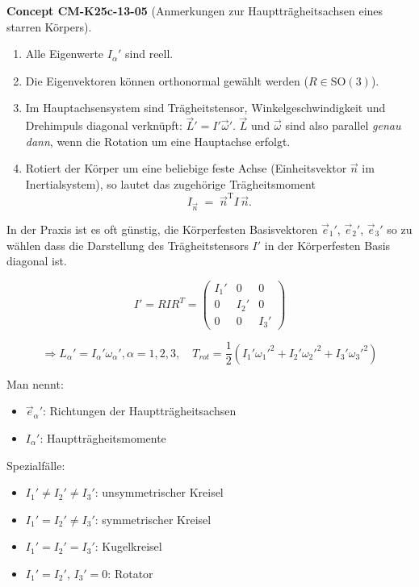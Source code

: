 \documentclass[10pt, letterpaper]{article}
\newcommand{\CustomHeading}[3]{%
  \par\medskip\noindent%
  \textbf{#1 #2} \textnormal{(#3)}.\enskip%
}
\newenvironment{CONC}[2]{\begin{unitbox}\CustomHeading{Concept}{#1}{#2}}{\end{unitbox}}
\begin{document}
\begin{CONC}{CM-K25c-13-05}{Anmerkungen zur Hauptträgheitsachsen eines starren Körpers}
\begin{enumerate}
  \item Alle Eigenwerte $I_\alpha'$ sind reell.
  \item Die Eigenvektoren können orthonormal gewählt werden
        ($R\in\mathrm{SO}(3)$).
  \item Im Hauptachsensystem sind Trägheits­tensor, Winkelgeschwindigkeit
        und Drehimpuls diagonal verknüpft:
        $\vec L' = I' \vec\omega'$.
        $\vec L$ und $\vec\omega$ sind also parallel
        \emph{genau dann},
        wenn die Rotation um eine Hauptachse erfolgt.
  \item Rotiert der Körper um eine beliebige feste Achse
        (Einheitsvektor $\vec n$ im Inertial­system),
        so lautet das zugehörige Trägheitsmoment
        \[
          I_{\vec n} \;=\;
          \vec n^{\mathrm T} I\,\vec n .
        \]
\end{enumerate}
\end{CONC}




In der Praxis ist es oft günstig, die Körperfesten Basisvektoren $\vec{e}_1'$, $\vec{e}_2'$, $\vec{e}_3'$ so zu wählen dass die Darstellung des Trägheitstensors $I'$ in der Körperfesten Basis diagonal ist.

\[
I' = R I R^T = \begin{pmatrix}
I_1' & 0 & 0 \\
0 & I_2' & 0 \\
0 & 0 & I_3'
\end{pmatrix}
\]

\[ \Rightarrow L_\alpha' = I_\alpha' \omega_\alpha', \alpha = 1,2,3, \quad T_{rot} = \frac{1}{2}(I_1'\omega_1'^2 + I_2'\omega_2'^2 + I_3'\omega_3'^2) \]

\noindent
Man nennt:
\begin{itemize}
\item $\vec{e}_\alpha'$: Richtungen der Hauptträgheitsachsen
\item $I_\alpha'$: Hauptträgheitsmomente
\end{itemize}

\noindent
Spezialfälle:
\begin{itemize}
\item $I_1' \neq I_2' \neq I_3'$: unsymmetrischer Kreisel
\item $I_1' = I_2' \neq I_3'$: symmetrischer Kreisel
\item $I_1' = I_2' = I_3'$: Kugelkreisel
\item $I_1' = I_2'$, $I_3' = 0$: Rotator
\end{itemize}
\end{document}
